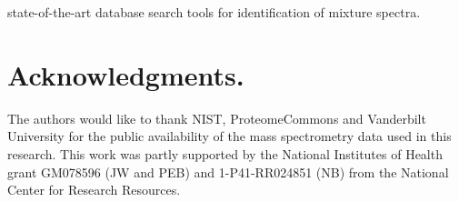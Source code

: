 \documentclass[runningheads,a4paper]{llncs}
\begin{document}
state-of-the-art database search tools for identification of mixture spectra.

\section*{Acknowledgments.} The authors would like to thank NIST, ProteomeCommons and Vanderbilt University for the public availability of the mass spectrometry data used in this research.  This work was partly supported by the National Institutes of Health grant GM078596 (JW and PEB) and 1-P41-RR024851 (NB) from the National Center for Research Resources.

\clearpage


\end{document}
